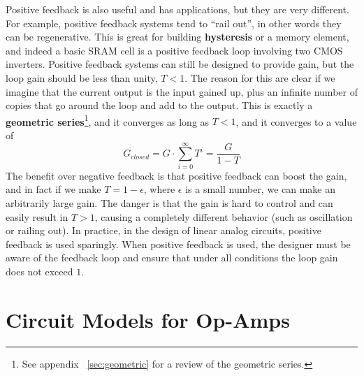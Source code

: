 Positive feedback is also useful and has applications, but they are very different.  For example, positive feedback systems tend to “rail out”, in other words they can be regenerative.  This is great for building \textbf{hysteresis} or a memory element, and indeed a basic SRAM cell is a positive feedback loop involving two CMOS inverters.  Positive feedback systems can still be designed to provide gain, but the loop gain should be less than unity, $T < 1$.  The reason for this are clear if we imagine that the current output is the input gained up, plus an infinite number of copies that go around the loop and add to the output.  This is exactly a \textbf{geometric series}\footnote{See appendix ~\ref{sec:geometric} for a review of the geometric series.}, and it converges as long as $T< 1$, and it converges to a value of
    \begin{equation}
        G_{closed} = G \cdot \sum_{i=0}^\infty T^i = \frac{G}{1 - T}
    \end{equation}
The benefit over negative feedback is that positive feedback can boost the gain, and in fact if we make $T = 1 - \epsilon$, where $\epsilon$ is a small number, we can make an arbitrarily large gain.  The danger is that the gain is hard to control and can easily result in $T > 1$, causing a completely different behavior (such as oscillation or railing out).  In practice, in the design of linear analog circuits, positive feedback is used sparingly.  When positive feedback is used, the designer must be aware of the feedback loop and ensure that under all conditions the loop gain does not exceed $1$.
\section{Circuit Models for Op-Amps}

